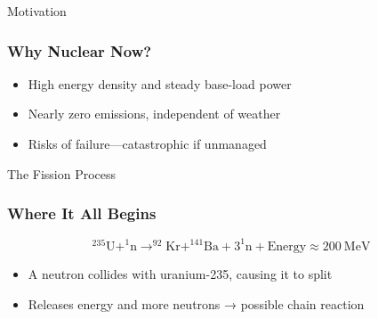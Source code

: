 \documentclass{beamer}
\begin{document}
\begin{frame}{Motivation}
  \subsubsection*{Why Nuclear Now?}
  \begin{itemize}
    \item High energy density and steady base-load power
    \item Nearly zero emissions, independent of weather
    \item Risks of failure—catastrophic if unmanaged
  \end{itemize}
\end{frame}

\begin{frame}{The Fission Process}
  \subsubsection*{Where It All Begins}
  \begin{equation}
    ^{235}\text{U} + ^{1}\text{n} \rightarrow ^{92}\text{Kr} + ^{141}\text{Ba} + 3^{1}\text{n} + \text{Energy} \approx 200~\text{MeV}
  \end{equation}
  \begin{itemize}
    \item A neutron collides with uranium-235, causing it to split
    \item Releases energy and more neutrons → possible chain reaction
  \end{itemize}
\end{frame}
\end{document}
